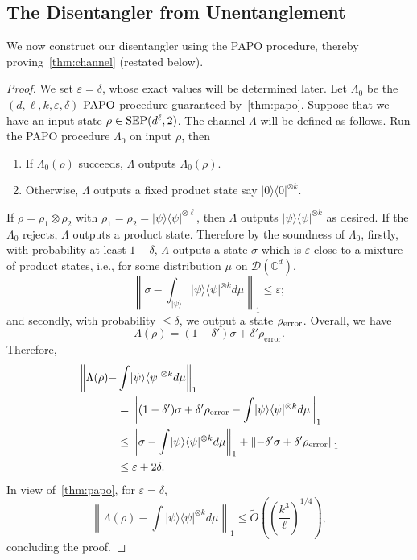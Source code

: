 \documentclass[10pt,a4paper]{article}
\theoremstyle{remark}
\def\epsilon{\varepsilon}
\def\cal{\mathcal}
\newcommand{\C}{{\mathbb C}}
\newcommand{\norm}[1]{\ensuremath{\left\lVert #1 \right\rVert}}
\newcommand{\calD}{{\cal D}}
\newcommand{\1}[1]{\mathds{1}{[#1]}}
\newcommand{\ket}[1]{\lvert #1\rangle}
\newcommand{\SEP}{\textup{SEP}}
\newcommand{\papo}{\textup{PAPO}}
\newcommand{\bra}[1]{\langle#1|}
\numberwithin{equation}{section}
\begin{document}
\subsection{The Disentangler from Unentanglement}
We now construct our disentangler using the PAPO procedure, thereby proving~\cref{thm:channel} (restated below).

\TheoChannel*

\begin{proof}
We set $\epsilon=\delta$, whose exact values will be determined later. Let $\Lambda_0$ be the $(d,\ell,k,\epsilon,\delta)$-$\papo$ procedure guaranteed by~\cref{thm:papo}.
Suppose that we have an input state $\rho \in \SEP(d^\ell,2)$.
The channel $\Lambda$ will be defined as follows. Run the PAPO procedure $\Lambda_0$ on input $\rho$, then
  \begin{enumerate}
    \item If $\Lambda_0(\rho)$ succeeds, $\Lambda$ outputs $\Lambda_0(\rho)$.
    \item Otherwise, $\Lambda$ outputs a fixed product state say $\ket{0}\bra{0}^{\otimes k}$.
  \end{enumerate}
If $\rho = \rho_1 \otimes \rho_2$ with $\rho_1 = \rho_2 = \ket{\psi}\bra{\psi}^{\otimes \ell}$, then $\Lambda$ outputs $\ket{\psi}\bra{\psi}^{\otimes k}$ as desired. If the $\Lambda_0$
rejects, $\Lambda$ outputs a product state. Therefore by the soundness of $\Lambda_0$, firstly, with probability at least $1-\delta$, $\Lambda$ outputs a state $\sigma$ which is $\epsilon$-close to a mixture of product states, i.e., for some distribution $\mu$ on $\calD(\C^d)$,
  \begin{equation*}
      \left\|\sigma-\int _{\ket\psi} \ket\psi\bra\psi ^{\otimes k} d \mu \right\|_1\le \epsilon;
  \end{equation*}
and secondly, with probability $\le\delta$, we output a state $\rho_{\textup{error}}$. 
Overall, we have
  \[
    \Lambda(\rho) = (1-\delta') \sigma + \delta' \rho_{\mathrm{error}}.
  \]
Therefore, 
  \begin{align*}
  \bigg\lVert 
    \Lambda(\rho) - &\int \ket{\psi}\bra{\psi}^{\otimes k}d\mu
  \bigg\rVert _1 
  \\
  &= \norm{(1-\delta') \sigma + \delta' \rho_{\textup{error}} - \int \ket{\psi}\bra{\psi}^{\otimes k}d\mu}_1
  \\
  &\le 
    \norm{\sigma - \int \ket{\psi}\bra{\psi}^{\otimes k}d\mu}_1+
    \norm{-\delta' \sigma + \delta' \rho_{\textup{error}}}_1
  \\
  &\le \epsilon + 2\delta.
  \end{align*}
In view of~\cref{thm:papo}, 
for $\epsilon=\delta$,  
\[
    \left\| 
        \Lambda(\rho) - \int \ket{\psi}\bra{\psi}^{\otimes k}d\mu
    \right\|_1 \le \tilde O\left(
        \left(\frac{k^3}{\ell}\right)^{1/4}\right),
\]
concluding the proof.
\end{proof}
\end{document}
